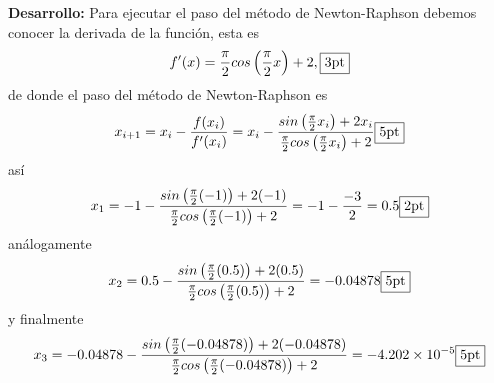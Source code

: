 \documentclass[11pt]{article}
\begin{document}
\begin{enumerate}
\textbf{Desarrollo:} Para ejecutar el paso del m\'etodo de Newton-Raphson debemos conocer la derivada de la funci\'on, esta es
$$
f'(x)=\frac{\pi}{2}cos\left(\frac{\pi}{2}x \right)+2, \fbox{3pt}
$$
de donde el paso del m\'etodo de Newton-Raphson es
$$
x_{i+1}=x_{i}-\frac{f(x_i)}{f'(x_i)}=x_{i}-\frac{sin\left(\frac{\pi}{2}x_i \right)+2x_i}{\frac{\pi}{2}cos\left(\frac{\pi}{2}x_i \right)+2}  \fbox{5pt}
$$
as\'i
$$
x_1=-1-\frac{sin\left(\frac{\pi}{2}(-1) \right)+2(-1)}{\frac{\pi}{2}cos\left(\frac{\pi}{2}(-1) \right)+2}=-1-\frac{-3}{2}=0.5 \fbox{2pt}
$$
an\'alogamente
$$
x_2=0.5-\frac{sin\left(\frac{\pi}{2}(0.5) \right)+2(0.5)}{\frac{\pi}{2}cos\left(\frac{\pi}{2}(0.5) \right)+2}=-0.04878 \fbox{5pt}
$$
y finalmente
$$
x_3=-0.04878-\frac{sin\left(\frac{\pi}{2}(-0.04878) \right)+2(-0.04878)}{\frac{\pi}{2}cos\left(\frac{\pi}{2}(-0.04878) \right)+2}=-4.202\times 10^{-5} \fbox{5pt}
$$


\end{enumerate}
\end{document}
